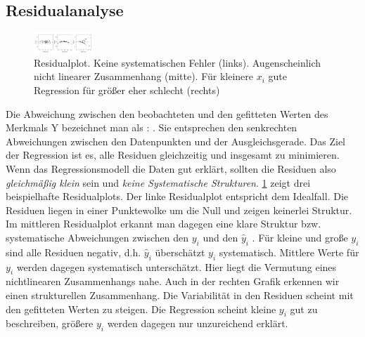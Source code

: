 \subsection{Residualanalyse}
\begin{figure}
    \vspace{-4mm}
    \centering
    \includegraphics[width=0.2\textwidth]{images/3.6_residualplots_bsp.png}
    \caption{Residualplot.  Keine systematischen Fehler (links). Augenscheinlich nicht linearer Zusammenhang (mitte). Für kleinere $x_i$ gute Regression für größer eher schlecht (rechts)}
    \vspace{-5mm}
    \label{fig:Residualplot}
\end{figure}
Die Abweichung zwischen den beobachteten und den gefitteten Werten des Merkmals Y bezeichnet man als : . Sie entsprechen den senkrechten Abweichungen zwischen den Datenpunkten und der Ausgleichsgerade. Das Ziel der Regression ist es, alle Residuen gleichzeitig und insgesamt zu minimieren. Wenn das Regressionsmodell die Daten gut erklärt, sollten die Residuen also \emph{gleichmäßig klein} sein und \emph{keine Systematische Strukturen}. \cref{fig:Residualplot} zeigt drei beispielhafte Residualplots. 
Der linke Residualplot entspricht dem Idealfall. Die Residuen liegen in einer Punktewolke um die Null und zeigen keinerlei Struktur. Im mittleren Residualplot erkannt man dagegen eine klare Struktur bzw. systematische Abweichungen zwischen den $y_i$ und den $\hat{y}_i$ . Für kleine und große $y_i$ sind alle Residuen negativ, d.h. $\hat{y}_i$ überschätzt $y_i$ systematisch. Mittlere Werte für $y_i$ werden dagegen systematisch unterschätzt. Hier liegt die Vermutung eines nichtlinearen Zusammenhangs nahe. Auch in der rechten Grafik erkennen wir einen strukturellen Zusammenhang. Die Variabilität in den Residuen scheint mit den gefitteten Werten zu steigen. Die Regression scheint kleine $y_i$ gut zu beschreiben, größere $y_i$ werden dagegen nur unzureichend erklärt.\linebreak\\
